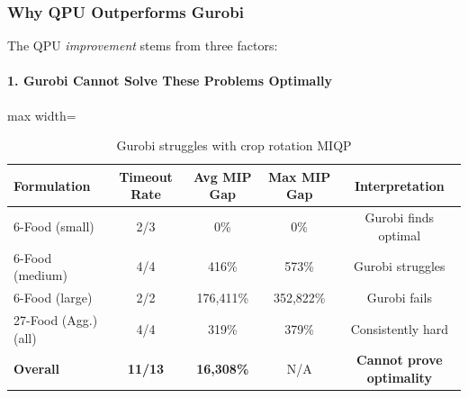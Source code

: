 

\subsubsection{Why QPU Outperforms Gurobi}

The QPU \textit{improvement} stems from three factors:

\paragraph{1. Gurobi Cannot Solve These Problems Optimally}

\begin{table}[H]
\centering
\caption{Gurobi struggles with crop rotation MIQP}
\label{tab:gurobi_struggles}
\begin{adjustbox}{max width=\textwidth}
\small
\begin{tabular}{lcccc}
\toprule
\textbf{Formulation} & \textbf{Timeout Rate} & \textbf{Avg MIP Gap} & \textbf{Max MIP Gap} & \textbf{Interpretation} \\
\midrule
6-Food (small) & 2/3 & 0\% & 0\% & Gurobi finds optimal \\
6-Food (medium) & 4/4 & 416\% & 573\% & Gurobi struggles \\
6-Food (large) & 2/2 & 176,411\% & 352,822\% & Gurobi fails \\
27-Food (Agg.) (all) & 4/4 & 319\% & 379\% & Consistently hard \\
\midrule
\textbf{Overall} & \textbf{11/13} & \textbf{16,308\%} & N/A & \textbf{Cannot prove optimality} \\
\bottomrule
\end{tabular}
\end{adjustbox}
\end{table}

